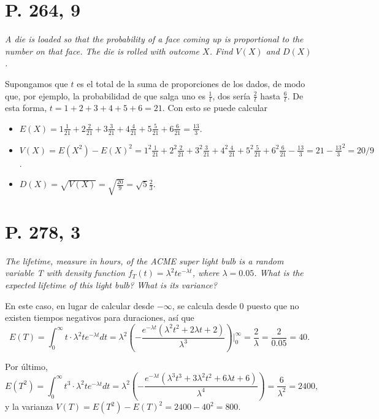 \documentclass[paper=leter, fontsize=11pt]{scrartcl}
\numberwithin{equation}{section}		%
\numberwithin{figure}{section}			%
\numberwithin{table}{section}				%
\begin{document}
\section*{P. 264, 9}
\emph{A die is loaded so that the probability of a face coming up is proportional to the number on that face. The die is rolled with outcome $X$. Find $V(X)$ and $D(X)$.}

Supongamos que $t$ es el total de la suma de proporciones de los dados, de modo que, por ejemplo, la probabilidad de que salga uno es $\frac{1}{t}$, dos sería $\frac{2}{t}$ hasta $\frac{6}{t}$. De esta forma, $t = 1 + 2 + 3 + 4 + 5 + 6 = 21$. Con esto se puede calcular
\begin{itemize}
    \item $E(X) = 1 \frac{1}{21} + 2 \frac{2}{21} + 3 \frac{3}{21} + 4 \frac{4}{21} + 5 \frac{5}{21} + 6 \frac{6}{21} = \frac{13}{3}$.
    \item $V(X) = E(X^2) - E(X)^2 = 1^2 \frac{1}{21} + 2^2 \frac{2}{21} + 3^2 \frac{3}{21} + 4^2 \frac{4}{21} + 5^2 \frac{5}{21} + 6^2 \frac{6}{21} - \frac{13}{3} = 21 - \frac{13}{3}^2 = 20 / 9$.
    \item $D(X) = \sqrt{V(X)} = \sqrt{\frac{20}{9}} = \sqrt{5}\frac{2}{3}$.
\end{itemize}


\section*{P. 278, 3}
\emph{The lifetime, measure in hours, of the ACME super light bulb is a random variable T with density function \(f_T (t) = \lambda^2 te^{- \lambda t}\), where \(\lambda = 0.05\). What is the expected lifetime of this light bulb? What is its variance?}

En este caso, en lugar de calcular desde $-\infty$, se calcula desde $0$ puesto que no existen tiempos negativos para duraciones, así que
\begin{dmath*}
    E(T) = \int^{\infty}_{0}t\cdot \lambda^{2}te^{-\lambda t}dt = \lambda^{2}\left (- \frac{e^{-\lambda t}(\lambda^{2}t^{2} + 2\lambda t + 2)}{\lambda^{3}} \right )|^{\infty}_{0} 
         = {\frac{2}{\lambda} = \frac{2}{0.05} = 40}.
\end{dmath*}

Por último,
\begin{dmath*}
    E(T^2) = \int^{\infty}_{0}t^{3}\cdot \lambda^{2}te^{-\lambda t}dt = \lambda^{2} \left (- \frac{e^{-\lambda t}(\lambda^{3}t^{3} + 3\lambda^{2}t^{2} + 6\lambda t + 6)}{\lambda^{4}} \right ) = \frac{6}{\lambda^{2}} = 2400,
\end{dmath*}
y la varianza $V(T) = E(T^2) - E(T)^2 = 2400 - 40^2 = 800$.
\end{document}
